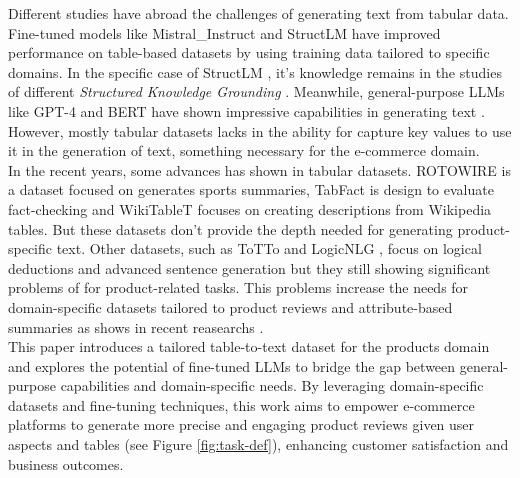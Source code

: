 Different studies have abroad the challenges of generating text from tabular data. Fine-tuned models like Mistral\_Instruct \citep{jiang2023mistral} and StructLM \citep{gao2024jsontuning} have improved performance on table-based datasets by using training data tailored to specific domains. In the specific case of StructLM \cite{zhuang2024structlm}, it's knowledge remains in the studies of different \textit{Structured Knowledge Grounding} \cite{xie2022unifiedskgunifyingmultitaskingstructured}. Meanwhile, general-purpose LLMs like GPT-4 and BERT have shown impressive capabilities in generating text \citep{openai2024gpt4technicalreport, devlin2019bertpretrainingdeepbidirectional}. However, mostly tabular datasets lacks in the ability for capture key values to use it in the generation of text, something necessary for the e-commerce domain.
\\

In the recent years, some advances has shown in tabular datasets. ROTOWIRE \citep{wiseman2017challengesdatatodocumentgeneration} is a dataset focused on generates sports summaries, TabFact \citep{2019TabFactA} is design to evaluate fact-checking and WikiTableT \citep{chen2021wikitabletlargescaledatatotextdataset} focuses on creating descriptions from Wikipedia tables. But these datasets don't provide the depth needed for generating product-specific text. Other datasets, such as ToTTo \citep{parikh2020tottocontrolledtabletotextgeneration} and LogicNLG \citep{chen2020logicalnaturallanguagegeneration}, focus on logical deductions and advanced sentence generation but they still showing significant problems of for product-related tasks. This problems increase the needs for domain-specific datasets tailored to product reviews and attribute-based summaries as shows in recent reasearchs \citep{He2023ReviewOS}.
\\

This paper introduces a tailored table-to-text dataset for the products domain and explores the potential of fine-tuned LLMs to bridge the gap between general-purpose capabilities and domain-specific needs. By leveraging domain-specific datasets and fine-tuning techniques, this work aims to empower e-commerce platforms to generate more precise and engaging product reviews given user aspects and tables (see Figure \ref{fig:task-def}), enhancing customer satisfaction and business outcomes.
